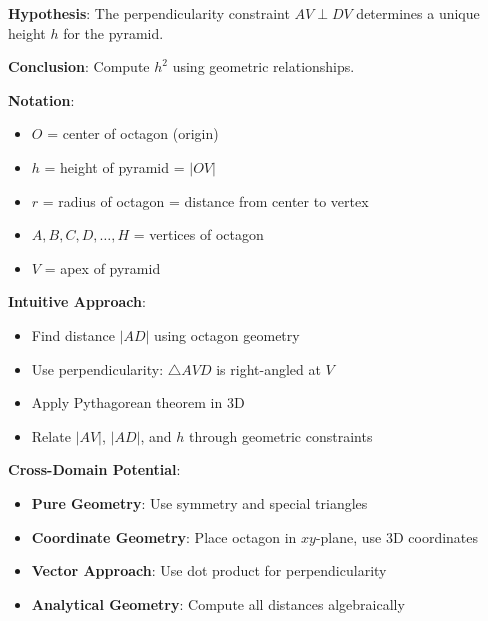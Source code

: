 \documentclass[12pt]{article}
\begin{document}
\begin{problemconfigbox}
\textbf{Hypothesis}: The perpendicularity constraint $AV \perp DV$ determines a unique height $h$ for the pyramid.

\textbf{Conclusion}: Compute $h^2$ using geometric relationships.

\textbf{Notation}:
\begin{itemize}
    \item $O$ = center of octagon (origin)
    \item $h$ = height of pyramid = $|OV|$
    \item $r$ = radius of octagon = distance from center to vertex
    \item $A, B, C, D, \ldots, H$ = vertices of octagon
    \item $V$ = apex of pyramid
\end{itemize}

\textbf{Intuitive Approach}:
\begin{itemize}
    \item Find distance $|AD|$ using octagon geometry
    \item Use perpendicularity: $\triangle AVD$ is right-angled at $V$
    \item Apply Pythagorean theorem in 3D
    \item Relate $|AV|$, $|AD|$, and $h$ through geometric constraints
\end{itemize}

\textbf{Cross-Domain Potential}:
\begin{itemize}
    \item \textbf{Pure Geometry}: Use symmetry and special triangles
    \item \textbf{Coordinate Geometry}: Place octagon in $xy$-plane, use 3D coordinates
    \item \textbf{Vector Approach}: Use dot product for perpendicularity
    \item \textbf{Analytical Geometry}: Compute all distances algebraically
\end{itemize}

\end{problemconfigbox}
\end{document}
